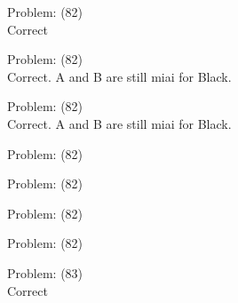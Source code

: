 \documentclass[11pt]{article}
\begin{document}
\begin{minipage}[t]{0.5\textwidth}
  {\centering
  
Problem: (82)\\
Correct\\
  }
\end{minipage}
\begin{minipage}[t]{0.5\textwidth}
  {\centering
  
Problem: (82)\\
Correct. A and B are still miai for Black.\\
  }
\end{minipage}
\begin{minipage}[t]{0.5\textwidth}
  {\centering
  
Problem: (82)\\
Correct. A and B are still miai for Black.\\
  }
\end{minipage}
\begin{minipage}[t]{0.5\textwidth}
  {\centering
  
Problem: (82)\\
  }
\end{minipage}
\begin{minipage}[t]{0.5\textwidth}
  {\centering
  
Problem: (82)\\
  }
\end{minipage}
\begin{minipage}[t]{0.5\textwidth}
  {\centering
  
Problem: (82)\\
  }
\end{minipage}
\begin{minipage}[t]{0.5\textwidth}
  {\centering
  
Problem: (82)\\
  }
\end{minipage}
\begin{minipage}[t]{0.5\textwidth}
  {\centering
  
Problem: (83)\\
Correct\\
  }
\end{minipage}
\end{document}
